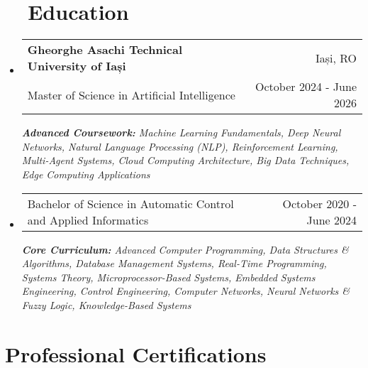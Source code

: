 \documentclass[a4paper,11pt]{article}
\makeatletter
\newcommand{\oracleDataScienceLink}{https://catalog-education.oracle.com/pls/certview/sharebadge?id=your-badge-id}
\newcommand{\oracleVectorSearchLink}{https://catalog-education.oracle.com/ords/certview/sharebadge?id=08BDD5D7DA29BEFF7F764053FD58DD5D7536402E95B847A926A53027CC0C1FCC}
\newcommand{\oracleGenAILink}{https://catalog-education.oracle.com/pls/certview/sharebadge?id=36F42AE9CD423CBEDFC5C81160E753619C6EC388D2CA3FB3FDBB2700CD1BE2AB}
\newcommand{\oracleAIFoundationsLink}{https://catalog-education.oracle.com/pls/certview/sharebadge?id=615C9F04543C7A32303E280E44615A75F07207864CD9E6FA301C63CE57A7FDD9}
\newcommand{\resumeSubheading}[4]{
  \vspace{-1pt}\item
    \begin{tabular*}{0.97\textwidth}{l@{\extracolsep{\fill}}r}
      \color{NavyBlue}\textbf{#1} & #2 \\
      #3 & #4 \\
    \end{tabular*}\vspace{-5pt}
}
\newcommand{\resumeSubheadingSimple}[2]{
  \vspace{-1pt}\item
    \begin{tabular*}{0.97\textwidth}{l@{\extracolsep{\fill}}r}
      #1 & #2 \\
    \end{tabular*}\vspace{-5pt}
}
\newcommand{\resumeSubHeadingListStart}{\begin{itemize}[leftmargin=*, label={}]}
\newcommand{\resumeSubHeadingListEnd}{\end{itemize}}
\makeatother
\begin{document}
\vspace{-5pt}
\section{~~Education}
\resumeSubHeadingListStart
  \resumeSubheading
    {Gheorghe Asachi Technical University of Iași}{Iași, RO}
    {Master of Science in Artificial Intelligence}{October 2024 - June 2026}
      {\par\footnotesize \textit{\textbf{Advanced Coursework:} Machine Learning Fundamentals, Deep Neural Networks, Natural Language Processing (NLP), Reinforcement Learning, Multi-Agent Systems, Cloud Computing Architecture, Big Data Techniques, Edge Computing Applications}}
  \vspace{-5pt}
      \resumeSubheadingSimple
    {Bachelor of Science in Automatic Control and Applied Informatics}{October 2020 - June 2024}
     {\par\footnotesize  \textit{\textbf{Core Curriculum:} Advanced Computer Programming, Data Structures \& Algorithms, Database Management Systems, Real-Time Programming, Systems Theory, Microprocessor-Based Systems, Embedded Systems Engineering, Control Engineering, Computer Networks, Neural Networks \& Fuzzy Logic, Knowledge-Based Systems}}
  \resumeSubHeadingListEnd    

\section{Professional Certifications}
\end{document}
